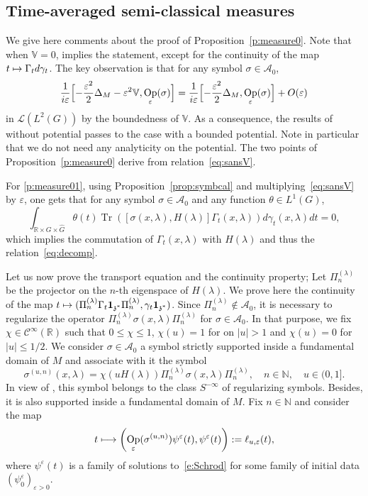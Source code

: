 \documentclass[JEP,XML,SOM,Unicode,published]{cedram}
\let\mathcal\mathscr
\newcommand\mto{\mathchoice{\longmapsto}{\mapsto}{\mapsto}{\mapsto}}
\newcommand{\bun}{\mathbf{1}}
\DeclareMathOperator{\Op}{Op}
\DeclareMathOperator{\Tr}{Tr}
\theoremstyle{plain}
\theoremstyle{definition}
\let\eps\varepsilon
\def\R{{\mathbb R}}
\def\N{{\mathbb N}}
\def\bbV{{\mathbb V}}
\begin{document}
\subsection{Time-averaged semi-classical measures}
\label{app:semiclas}

We give here comments about the proof of Proposition~\ref{p:measure0}. Note that when $\bbV=0$, \cite[Th.\,2.10(ii)(2)]{FF} implies the statement, except for the continuity of the map $t\mto \Gamma_t d\gamma_t$. The key observation is that for any symbol $\sigma\in\mathcal A_0$,
\begin{equation}\label{eq:sansV}
\frac 1{i\eps} \Bigl[ -\frac{\eps^2}{2}\Delta_M -\eps^2 \bbV, \Op_\eps(\sigma)\Bigr] = \frac 1{i\eps} \Bigl[ -\frac{\eps^2}{2}\Delta_M, \Op_\eps(\sigma)\Bigr] + O(\eps)
\end{equation}
in ${\mathcal L}(L^2(G))$ by the boundedness of $\bbV$. As a consequence, the results of \cite[Th.\,2.10(ii)(2)]{FF} without potential passes to the case with a bounded potential. Note in particular that we do not need any analyticity on the potential.
The two points of Proposition~\ref{p:measure0} derive from relation~\eqref{eq:sansV}.

For \eqref{p:measure01}, using Proposition~\ref{prop:symbcal} and multiplying~\eqref{eq:sansV} by $\eps$, one gets that for any symbol $\sigma\in\mathcal A_0$ and any function $\theta\in L^1(G)$,
\[
\int_{\R\times G \times \hat G} \theta(t) \Tr ([\sigma(x,\lambda),H(\lambda)] \Gamma_t(x,\lambda)) d\gamma_t(x,\lambda) dt=0,
\]
which implies the commutation of $\Gamma_t(x,\lambda)$ with $H(\lambda)$ and thus the relation~\ref{eq:decomp}.

Let us now prove the transport equation and the continuity property;
Let $\Pi_n^{(\lambda)}$ be the projector on the $n$-th eigenspace of $H(\lambda)$.
We prove here the continuity of the map $t\mto (\Pi_n^{(\lambda)}\Gamma_t \bun_{\mathfrak z^*}\Pi_n^{(\lambda)},\gamma_t \bun_{\mathfrak z^*})$. Since $\Pi_n^{(\lambda)}\notin{\mathcal A}_0$, it is necessary to regularize the operator $\Pi_n^{(\lambda)} \sigma(x,\lambda)\Pi_n^{(\lambda)}$ for $\sigma\in\mathcal{A}_0$.
In that purpose, we fix $\chi\in{\mathcal C}^\infty(\R)$ such that $0\leq \chi\leq 1$, $\chi(u)=1$ for on $|u|>1$ and $\chi(u)=0$ for $|u|\leq 1/2$. We consider $\sigma\in {{\mathcal A}_0}$ a symbol strictly supported inside a fundamental domain of $M$ and associate with it the symbol
\[
\sigma^{(u,n)}(x,\lambda)= \chi(uH(\lambda)) \Pi_n^{(\lambda)} \sigma(x,\lambda)\Pi_n^{(\lambda)},\quad n\in\N,\quad u\in (0,1].
\]
In view of \cite[Cor.\,3.9]{FF}, this symbol belongs to the class $S^{-\infty}$ of regularizing symbols. Besides, it is also supported inside a fundamental domain of $M$.
Fix $n\in\N$ and consider the map
\[
t\mto \left(\Op_\eps(\sigma^{(u,n)}) \psi^\eps(t),\psi^\eps(t)\right):=\ell_{u,\eps}(t),
\]
where $\psi^\eps(t)$ is a family of solutions to~\eqref{e:Schrod} for some family of initial data $(\psi^\eps_0)_{\eps>0}$.
\end{document}
